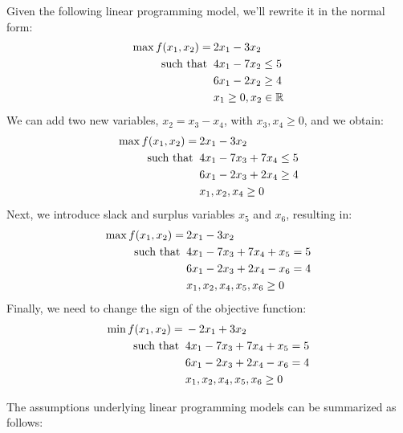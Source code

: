 \documentclass[12pt, a4paper]{report}
\begin{document}
    \begin{example}
        Given the following linear programming model, we'll rewrite it in the normal form:
        \begin{align*}
            \max{f(x_1,x_2)}           =&\: 2x_1-3x_2          \\
            \textnormal{such that }     &\: 4x_1-7x_2 \leq 5  \\
                                        &\: 6x_1-2x_2 \geq 4  \\
                                        &\: x_1 \geq 0, x_2 \in \mathbb{R}
        \end{align*}
        We can add two new variables, $x_2=x_3-x_4$, with $x_3,x_4 \geq 0$, and we obtain:
        \begin{align*}
            \max{f(x_1,x_2)}           =&\: 2x_1-3x_2          \\
            \textnormal{such that }     &\: 4x_1-7x_3+7x_4 \leq 5  \\
                                        &\: 6x_1-2x_3+2x_4 \geq 4  \\
                                        &\: x_1,x_2,x_4 \geq 0
        \end{align*}
        Next, we introduce slack and surplus variables $x_5$ and $x_6$, resulting in:
        \begin{align*}
            \max{f(x_1,x_2)}           =&\: 2x_1-3x_2          \\
            \textnormal{such that }     &\: 4x_1-7x_3+7x_4+x_5 = 5  \\
                                        &\: 6x_1-2x_3+2x_4-x_6 = 4  \\
                                        &\: x_1,x_2,x_4,x_5,x_6 \geq 0
        \end{align*}
        Finally, we need to change the sign of the objective function:
        \begin{align*}
            \min{f(x_1,x_2)}           =&\: -2x_1+3x_2          \\
            \textnormal{such that }     &\: 4x_1-7x_3+7x_4+x_5 = 5  \\
                                        &\: 6x_1-2x_3+2x_4-x_6 = 4  \\
                                        &\: x_1,x_2,x_4,x_5,x_6 \geq 0
        \end{align*}
    \end{example}
    The assumptions underlying linear programming models can be summarized as follows:
\end{document}
